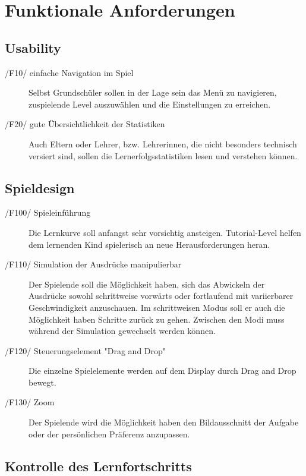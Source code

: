 \section{Funktionale Anforderungen}

\subsection{Usability}

\begin{description}
	\item[/F10/ einfache Navigation im Spiel] \label{F10}
	Selbst Grundschüler sollen in der Lage sein das Menü zu navigieren, zuspielende Level auszuwählen und die Einstellungen zu erreichen.
	\item[/F20/ gute Übersichtlichkeit der Statistiken] \label{F10} 
	Auch  Eltern oder Lehrer, bzw. Lehrerinnen, die nicht besonders technisch versiert sind, sollen die Lernerfolgsstatistiken lesen und verstehen können.
\end{description}

\subsection{Spieldesign}

\begin{description}
	\item[/F100/ Spieleinführung] \label{F100} 
	Die Lernkurve soll anfangst sehr vorsichtig ansteigen. Tutorial-Level helfen dem lernenden Kind spielerisch an neue Herausforderungen heran.
	\item[/F110/ Simulation der Ausdrücke manipulierbar] \label{F110} 
	Der Spielende soll die Möglichkeit haben, sich das Abwickeln der Ausdrücke sowohl schrittweise vorwärts oder fortlaufend mit variierbarer Geschwindigkeit anzuschauen. Im schrittweisen Modus soll er auch die Möglichkeit haben Schritte zurück zu gehen. Zwischen den Modi muss während der Simulation gewechselt werden können.
	\item[/F120/ Steuerungselement "Drag and Drop"]\label{F120} 
	Die einzelne Spielelemente werden auf dem Display durch Drag and Drop bewegt.
	\item[/F130/ Zoom]\label{F130} 
	Der Spielende wird die Möglichkeit haben den Bildausschnitt der Aufgabe oder der persönlichen Präferenz anzupassen.	

\end{description}


\subsection{Kontrolle des Lernfortschritts}

